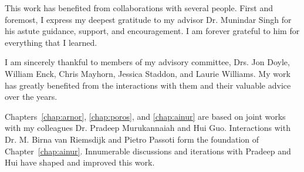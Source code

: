 \begin{acknowledgements}

This work has benefited from collaborations with several people.
First and foremost, I express my deepest gratitude to my advisor Dr. Munindar Singh for his astute guidance, support, and encouragement. 
I am forever grateful to him for everything that I learned. 

I am sincerely thankful to members of my advisory committee, Drs. Jon Doyle, William Enck, Chris Mayhorn, Jessica Staddon, and Laurie Williams. 
My work has greatly benefited from the interactions with them and their valuable advice over the years. 

Chapters~\ref{chap:arnor}, \ref{chap:poros}, and \ref{chap:ainur} are based on joint
works with my colleagues Dr. Pradeep Murukannaiah and Hui Guo. 
Interactions with Dr. M. Birna van Riemsdijk and Pietro Passoti form the foundation of Chapter~\ref{chap:ainur}.
Innumerable discussions and iterations with Pradeep and Hui have shaped and improved this work. 


\end{acknowledgements}

